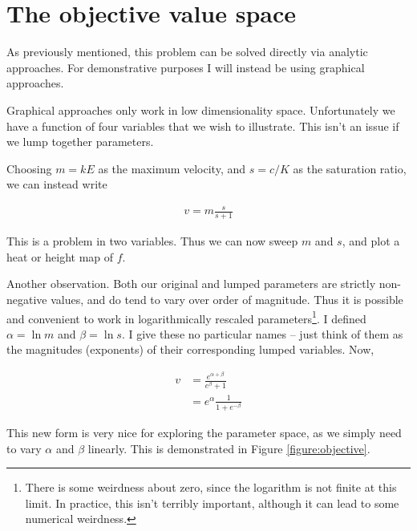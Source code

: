 \documentclass{article}
\begin{document}
\section{The objective value space}

As previously mentioned, this problem can be solved directly via analytic approaches.  For demonstrative purposes I will instead be using graphical approaches.

Graphical approaches only work in low dimensionality space.  Unfortunately we have a function of four variables that we wish to illustrate.  This isn't an issue if we lump together parameters.

Choosing \(m = k E\) as the maximum velocity, and \(s = c/K\) as the saturation ratio, we can instead write

\begin{align}
v = m \frac{s}{s + 1}
\end{align}

This is a problem in two variables.  Thus we can now sweep \(m\) and \(s\), and plot a heat or height map of \(f\).

Another observation.  Both our original and lumped parameters are strictly non-negative values, and do tend to vary over order of magnitude.  Thus it is possible and convenient to work in logarithmically rescaled parameters\footnote{There is some weirdness about zero, since the logarithm is not finite at this limit.  In practice, this isn't terribly important, although it can lead to some numerical weirdness.}.  I defined \(\alpha = \ln m\) and \(\beta = \ln s\).  I give these no particular names -- just think of them as the magnitudes (exponents) of their corresponding lumped variables.  Now,

\begin{align}
v &= \frac{ e^{\alpha + \beta}}{e^\beta + 1}
\\ &= e^\alpha \frac{1}{1 + e^{-\beta}}
\end{align}

This new form is very nice for exploring the parameter space, as we simply need to vary \(\alpha\) and \(\beta\) linearly.  This is demonstrated in Figure \ref{figure:objective}.
\end{document}
